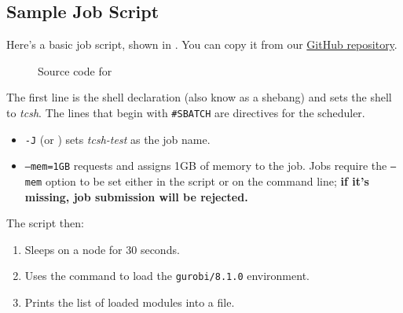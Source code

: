 \subsection{Sample Job Script}
\label{sect:sample-job-script}

Here's a basic job script,  shown in .
You can copy it from our \href{https://github.com/NAG-DevOps/speed-hpc}{GitHub repository}.

\begin{figure}[htpb]
	
	\caption{Source code for }
	\label{fig:tcsh.sh}
\end{figure}

\noindent The first line is the shell declaration (also know as a shebang) and sets the shell to \emph{tcsh}.
The lines that begin with \texttt{\#SBATCH} are directives for the scheduler.
\begin{itemize}
	\item \texttt{-J} (or ) sets \emph{tcsh-test} as the job name.
	\item \texttt{--mem=1GB} requests and assigns 1GB of memory to the job. 
	Jobs require the \texttt{--mem} option to be set either in the script
	or on the command line; \textbf{if it's missing, job submission will be rejected.}
\end{itemize}

\noindent The script then:
\begin{enumerate}
	\item Sleeps on a node for 30 seconds.
	\item Uses the  command to load the \texttt{gurobi/8.1.0} environment.
	\item Prints the list of loaded modules into a file.
\end{enumerate}

